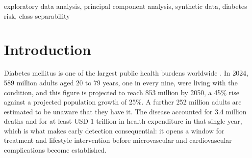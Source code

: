 \documentclass[conference]{IEEEtran}
\begin{document}
\begin{abstract}
This work presents an exploratory analysis of a publicly available
synthetic dataset of diabetes risk, with the goal of characterising
which of its predictors carry discriminative information before any
predictive model is considered.
The dataset comprises $N = 50{,}000$ records, $D = 22$ predictors and
$L = 3$ risk classes, with a strongly imbalanced class distribution in
which the \emph{Low} class holds only $0.94\%$ of the observations.
We combine unconditional and class-conditional univariate statistics,
pairwise Pearson correlation and a principal component analysis (PCA)
implemented from first principles, without recourse to pre-made PCA
routines.
Two glycemic markers, fasting blood sugar and HbA1c, separate the risk
classes almost by themselves, yet the first two principal components
account for only $15.2\%$ of the total variance. Three independent
lines of evidence, an excess kurtosis of $-1.2$ in 19 of the 20
quantitative predictors, a median absolute pairwise correlation of
$0.003$, and an eigenvalue spectrum flat at unity, converge on the same
conclusion: the predictors were drawn independently from bounded
uniform distributions, and the only structural relationship the data
contain is the algebraic identity that defines the body mass index.
\end{abstract}

\begin{IEEEkeywords}
exploratory data analysis, principal component analysis, synthetic
data, diabetes risk, class separability
\end{IEEEkeywords}

\section{Introduction}
\label{sec:intro}

Diabetes mellitus is one of the largest public health burdens
worldwide \cite{idf2021}. In 2024, 589 million adults aged 20 to 79
years, one in every nine, were living with the condition, and this
figure is projected to reach 853 million by 2050, a 45\% rise against
a projected population growth of 25\%. A further 252 million adults
are estimated to be unaware that they have it. The disease accounted
for 3.4 million deaths and for at least USD 1 trillion in health
expenditure in that single year, which is what makes early detection
consequential: it opens a window for treatment and lifestyle
intervention before microvascular and cardiovascular complications
become established.
\end{document}
